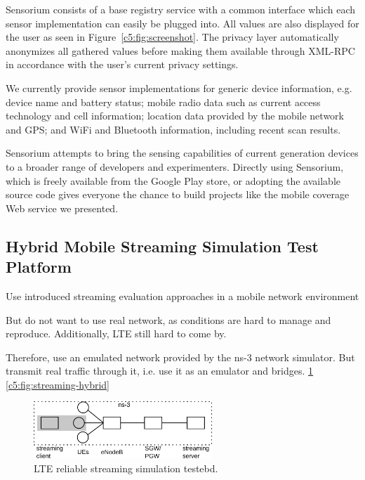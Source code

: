 Sensorium consists of a base registry service with a common interface which each sensor implementation can easily be plugged into. All values are also displayed for the user as seen in Figure~\ref{c5:fig:screenshot}. The privacy layer automatically anonymizes all gathered values before making them available through XML-RPC in accordance with the user's current privacy settings.

We currently provide sensor implementations for generic device information, e.g. device name and battery status; mobile radio data such as current access technology and cell information; location data provided by the mobile network and \gls{GPS}; and  WiFi and Bluetooth information, including recent scan results.

Sensorium attempts to bring the sensing capabilities of current generation devices to a broader range of developers and experimenters. Directly using Sensorium, which is freely available from the Google Play store, or adopting the available source code gives everyone the chance to build projects like the mobile coverage Web service we presented.


\subsection{Hybrid Mobile Streaming Simulation Test Platform}

Use introduced streaming evaluation approaches in a mobile network environment

But do not want to use real network, as conditions are hard to manage and reproduce. Additionally, LTE still hard to come by.

Therefore, use an emulated network provided by the ns-3 network simulator. But transmit real traffic through it, i.e. use it as an emulator and bridges. \ref{c5:fig:streaming-simulation} \ref{c5:fig:streaming-hybrid}


\begin{figure}[htb]
\centering
\includegraphics[width=0.6\textwidth]{images/streaming-simulation.pdf}
\caption{\gls{LTE} reliable streaming simulation testebd.}
\label{c5:fig:streaming-simulation}
\end{figure}

